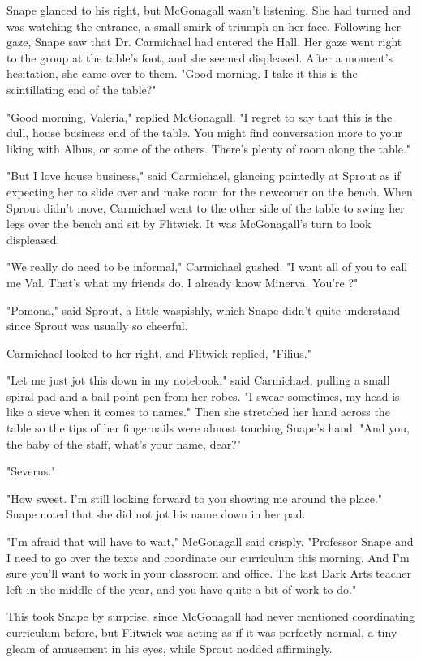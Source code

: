 Snape glanced to his right, but McGonagall wasn't listening. She had turned and was watching the entrance, a small smirk of triumph on her face. Following her gaze, Snape saw that Dr. Carmichael had entered the Hall. Her gaze went right to the group at the table's foot, and she seemed displeased. After a moment's hesitation, she came over to them. "Good morning. I take it this is the scintillating end of the table?"

"Good morning, Valeria," replied McGonagall. "I regret to say that this is the dull, house business end of the table. You might find conversation more to your liking with Albus, or some of the others. There's plenty of room along the table."

"But I love house business," said Carmichael, glancing pointedly at Sprout as if expecting her to slide over and make room for the newcomer on the bench. When Sprout didn't move, Carmichael went to the other side of the table to swing her legs over the bench and sit by Flitwick. It was McGonagall's turn to look displeased.

"We really do need to be informal," Carmichael gushed. "I want all of you to call me Val. That's what my friends do. I already know Minerva. You're{\el} ?"

"Pomona," said Sprout, a little waspishly, which Snape didn't quite understand since Sprout was usually so cheerful.

Carmichael looked to her right, and Flitwick replied, "Filius."

"Let me just jot this down in my notebook," said Carmichael, pulling a small spiral pad and a ball-point pen from her robes. "I swear sometimes, my head is like a sieve when it comes to names." Then she stretched her hand across the table so the tips of her fingernails were almost touching Snape's hand. "And you, the baby of the staff, what's your name, dear?"

"Severus."

"How sweet. I'm still looking forward to you showing me around the place." Snape noted that she did not jot his name down in her pad.

"I'm afraid that will have to wait," McGonagall said crisply. "Professor Snape and I need to go over the texts and coordinate our curriculum this morning. And I'm sure you'll want to work in your classroom and office. The last Dark Arts teacher left in the middle of the year, and you have quite a bit of work to do."

This took Snape by surprise, since McGonagall had never mentioned coordinating curriculum before, but Flitwick was acting as if it was perfectly normal, a tiny gleam of amusement in his eyes, while Sprout nodded affirmingly.

